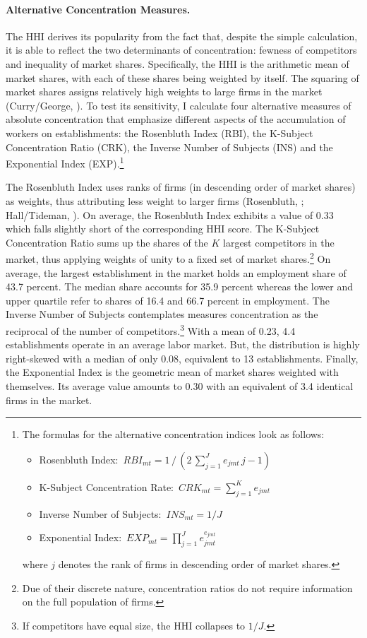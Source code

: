 \documentclass[11pt,oneside,reqno,xcolor=dvipsnames]{article} %
\begin{document}
\paragraph{Alternative Concentration Measures.} The HHI derives its popularity from the fact that, despite the simple calculation, it is able to reflect the two determinants of concentration: fewness of competitors and inequality of market shares. Specifically, the HHI is the arithmetic mean of market shares, with each of these shares being weighted by itself. The squaring of market shares assigns relatively high weights to large firms in the market (Curry/George, \citeyear{CurryGeorge1983}). To test its sensitivity, I calculate four alternative measures of absolute concentration that emphasize different aspects of the accumulation of workers on establishments: the Rosenbluth Index (RBI), the K-Subject Concentration Ratio (CRK), the Inverse Number of Subjects (INS) and the Exponential Index (EXP).\footnote{The formulas for the alternative concentration indices look as follows: \\[-0.6cm]
\begin{itemize}
\item Rosenbluth Index:\, $ RB\!I_{mt} =  1 \, / \, (  2\,\sum_{j=1}^{J} e_{jmt} \, j - 1 ) $
\item K-Subject Concentration Rate:\, $ C\!RK_{mt} =  \sum_{j=1}^{K} e_{jmt} $
\item Inverse Number of Subjects:\, $ I\!N\!S_{mt} =  1/J $
\item Exponential Index:\, $ E\!X\!P_{mt} = \prod_{j=1}^{J} e_{jmt}^{e_{jmt}} $
\end{itemize} \vspace*{-0.1cm}
where $j$ denotes the rank of firms in descending order of market shares.}

The Rosenbluth Index uses ranks of firms (in descending order of market shares) as weights, thus attributing less weight to larger firms (Rosenbluth, \citeyear{Rosenbluth1955}; Hall/Tideman, \citeyear{HallTideman1967}). On average, the Rosenbluth Index exhibits a value of 0.33 which falls slightly short of the corresponding HHI score. The K-Subject Concentration Ratio sums up the shares of the $K$ largest competitors in the market, thus applying weights of unity to a fixed set of market shares.\footnote{Due of their discrete nature, concentration ratios do not require information on the full population of firms.} On average, the largest establishment in the market holds an employment share of 43.7 percent. The median share accounts for 35.9 percent whereas the lower and upper quartile refer to shares of 16.4 and 66.7 percent in employment. The Inverse Number of Subjects contemplates measures concentration as the reciprocal of the number of competitors.\footnote{If competitors have equal size, the HHI collapses to $1/J$.} With a mean of 0.23, 4.4 establishments operate in an average labor market. But, the distribution is highly right-skewed with a median of only 0.08, equivalent to 13 establishments. Finally, the Exponential Index is the geometric mean of market shares weighted with themselves. Its average value amounts to 0.30 with an equivalent of 3.4 identical firms in the market.
\end{document}
